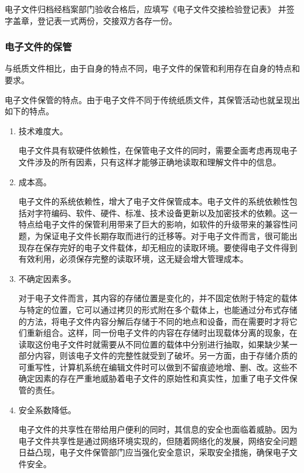     电子文件归档经档案部门验收合格后，应填写《电子文件交接检验登记表》 并签字盖章，登记表一式两份，交接双方各存一份。

    \subsubsection {电子文件的保管}

    与纸质文件相比，由于自身的特点不同，电子文件的保管和利用存在自身的特点和要求。

    \begin{enumerate.zh}
    \item 电子文件保管的特点。由于电子文件不同于传统纸质文件，其保管活动也就呈现出如下的特点。
        \begin{enumerate}
            \item  技术难度大。

            电子文件具有软硬件依赖性，在保管电子文件的同时，需要全面考虑再现电子文件涉及的所有因素，只有这样才能够正确地读取和理解文件中的信息。
            \item  成本高。

            电子文件的系统依赖性，增大了电子文件保管成本。电子文件的系统依赖性包括对字符编码、软件、硬件、标准、技术设备更新以及加密技术的依赖。这一特点给电子文件的保管利用带来了巨大的影响，如软件的升级带来的兼容性问题，为保证电子文件长期存取而进行的迁移等。对于电子文件而言，很可能出现存在保存完好的电子文件载体，却无相应的读取环境。要使得电子文件得到有效利用，必须保存完整的读取环境，这无疑会增大管理成本。
            \item  不确定因素多。

            对于电子文件而言，其内容的存储位置是变化的，并不固定依附于特定的载体与特定的位置，它可以通过拷贝的形式附在多个载体上，也能通过分布式存储的方法，将电子文件内容分解后存储于不同的地点和设备，而在需要时才将它们重新组合。这样，同一份电子文件的内容在存储时出现载体分离的现象，在读取这份电子文件时就需要从不同位置的载体中分别进行抽取，如果缺少某一部分内容，则该电子文件的完整性就受到了破坏。另一方面，由于存储介质的可重写性，计算机系统在编辑文件时可以做到不留痕迹地增、删、改。这些不确定因素的存在严重地威胁着电子文件的原始性和真实性，加重了电子文件保管的责任。
            \item  安全系数降低。

            电子文件的共享性在带给用户便利的同时，其信息的安全也面临着威胁。因为电子文件共享性是通过网络环境实现的，但随着网络化的发展，网络安全问题日益凸现，电子文件保管部门应当强化安全意识，采取安全措施，确保电子文件安全。
        \end{enumerate}


\end{enumerate.zh}

